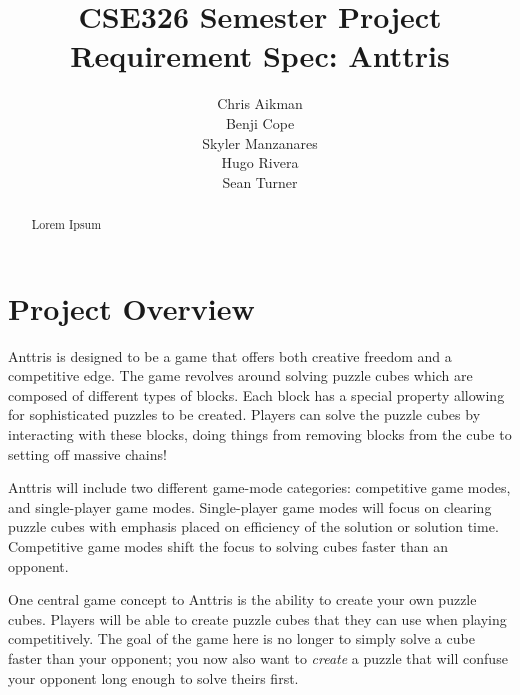 \documentclass[12pt]{article}
\begin{document}
\title{CSE326 Semester Project Requirement Spec: Anttris}
\author{Chris Aikman\\Benji Cope\\Skyler Manzanares\\Hugo Rivera\\Sean Turner}
\maketitle
\begin{abstract}
Lorem Ipsum
\end{abstract}
\section{Project Overview}\label{overview-SM}
Anttris is designed to be a game that offers both creative freedom and a competitive edge. The game revolves around solving puzzle cubes which are composed of different types of blocks. Each block has a special property allowing for sophisticated puzzles to be created. Players can solve the puzzle cubes by interacting with these blocks, doing things from removing blocks from the cube to setting off massive chains!

Anttris will include two different game-mode categories: competitive game modes, and single-player game modes. Single-player game modes will focus on clearing puzzle cubes with emphasis placed on efficiency of the solution or solution time. Competitive game modes shift the focus to solving cubes faster than an opponent.

One central game concept to Anttris is the ability to create your own puzzle cubes. Players will be able to create puzzle cubes that they can use when playing competitively. The goal of the game here is no longer to simply solve a cube faster than your opponent; you now also want to \textsl{create} a puzzle that will confuse your opponent long enough to solve theirs first.
\end{document}
